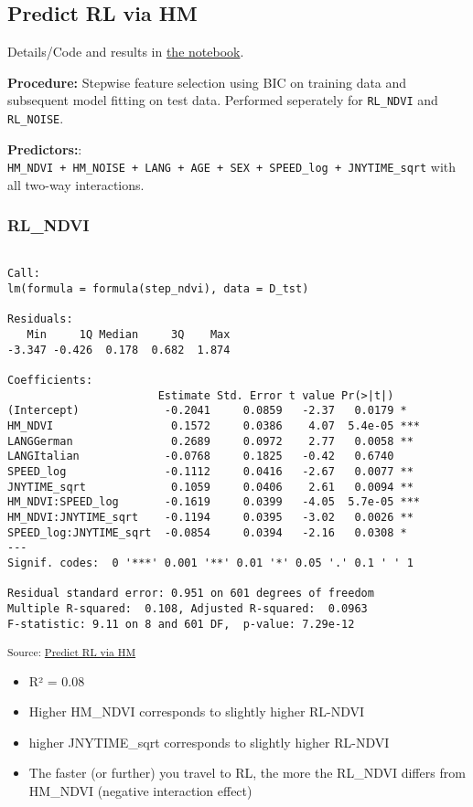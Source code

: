 \documentclass[
  letterpaper,
  DIV=11,
  numbers=noendperiod]{scrartcl}
\providecommand{\tightlist}{%
  \setlength{\itemsep}{0pt}\setlength{\parskip}{0pt}}
\begin{document}
\subsection{Predict RL via HM}\label{predict-rl-via-hm}

Details/Code and results in \href{notebooks/RL-via-HM.qmd}{the
notebook}.

\textbf{Procedure:} Stepwise feature selection using BIC on training
data and subsequent model fitting on test data. Performed seperately for
\texttt{RL\_NDVI} and \texttt{RL\_NOISE}.

\textbf{Predictors:}:
\texttt{HM\_NDVI\ +\ HM\_NOISE\ +\ LANG\ +\ AGE\ +\ SEX\ +\ SPEED\_log\ +\ JNYTIME\_sqrt}
with all two-way interactions.

\subsubsection{RL\_NDVI}\label{rl_ndvi}

\begin{verbatim}

Call:
lm(formula = formula(step_ndvi), data = D_tst)

Residuals:
   Min     1Q Median     3Q    Max 
-3.347 -0.426  0.178  0.682  1.874 

Coefficients:
                       Estimate Std. Error t value Pr(>|t|)    
(Intercept)             -0.2041     0.0859   -2.37   0.0179 *  
HM_NDVI                  0.1572     0.0386    4.07  5.4e-05 ***
LANGGerman               0.2689     0.0972    2.77   0.0058 ** 
LANGItalian             -0.0768     0.1825   -0.42   0.6740    
SPEED_log               -0.1112     0.0416   -2.67   0.0077 ** 
JNYTIME_sqrt             0.1059     0.0406    2.61   0.0094 ** 
HM_NDVI:SPEED_log       -0.1619     0.0399   -4.05  5.7e-05 ***
HM_NDVI:JNYTIME_sqrt    -0.1194     0.0395   -3.02   0.0026 ** 
SPEED_log:JNYTIME_sqrt  -0.0854     0.0394   -2.16   0.0308 *  
---
Signif. codes:  0 '***' 0.001 '**' 0.01 '*' 0.05 '.' 0.1 ' ' 1

Residual standard error: 0.951 on 601 degrees of freedom
Multiple R-squared:  0.108, Adjusted R-squared:  0.0963 
F-statistic: 9.11 on 8 and 601 DF,  p-value: 7.29e-12
\end{verbatim}

\textsubscript{Source:
\href{https://LGraz.github.io/wsl--prs-analysis/notebooks/RL-via-HM-preview.html\#cell-lm-summary-rl-ndvi}{Predict
RL via HM}}

\begin{itemize}
\tightlist
\item
  R² = 0.08
\item
  Higher HM\_NDVI corresponds to slightly higher RL-NDVI
\item
  higher JNYTIME\_sqrt corresponds to slightly higher RL-NDVI
\item
  The faster (or further) you travel to RL, the more the RL\_NDVI
  differs from HM\_NDVI (negative interaction effect)
\end{itemize}
\end{document}
